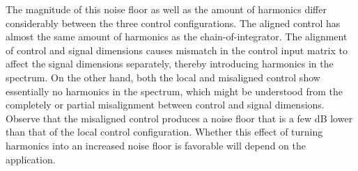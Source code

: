 The magnitude of this noise floor as well as the amount of harmonics differ considerably between the three control configurations. The aligned control has almost the same amount of harmonics as the chain-of-integrator. The alignment of control and signal dimensions causes mismatch in the control input matrix to affect the signal dimensions separately, thereby introducing harmonics in the spectrum. On the other hand, both the local and misaligned control show essentially no harmonics in the spectrum, which might be understood from the completely or partial misalignment between control and signal dimensions. Observe that the misaligned control produces a noise floor that is a few dB lower than that of the local control configuration. Whether this effect of turning harmonics into an increased noise floor is favorable will depend on the application.

